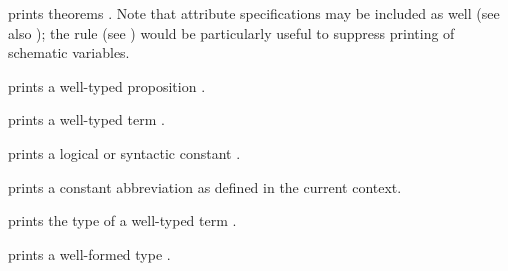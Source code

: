 \begin{isabellebody}
\begin{isamarkuptext}
\begin{descr}
  \item [\isa{{\isachardoublequote}{\isacharat}{\isacharbraceleft}thm\ a\isactrlsub {\isadigit{1}}\ {\isasymdots}\ a\isactrlsub n{\isacharbraceright}{\isachardoublequote}}] prints theorems
  .  Note that attribute specifications
  may be included as well (see also ); the
  \hyperlink{attribute.no-vars}{\mbox{}} rule (see ) would
  be particularly useful to suppress printing of schematic variables.

  \item [\isa{{\isachardoublequote}{\isacharat}{\isacharbraceleft}prop\ {\isasymphi}{\isacharbraceright}{\isachardoublequote}}] prints a well-typed proposition \isa{{\isachardoublequote}{\isasymphi}{\isachardoublequote}}.

  \item [\isa{{\isachardoublequote}{\isacharat}{\isacharbraceleft}term\ t{\isacharbraceright}{\isachardoublequote}}] prints a well-typed term .

  \item [\isa{{\isachardoublequote}{\isacharat}{\isacharbraceleft}const\ c{\isacharbraceright}{\isachardoublequote}}] prints a logical or syntactic constant
  .
  
  \item [\isa{{\isachardoublequote}{\isacharat}{\isacharbraceleft}abbrev\ c\ x\isactrlsub {\isadigit{1}}\ {\isasymdots}\ x\isactrlsub n{\isacharbraceright}{\isachardoublequote}}] prints a constant
  abbreviation  as defined in
  the current context.

  \item [\isa{{\isachardoublequote}{\isacharat}{\isacharbraceleft}typeof\ t{\isacharbraceright}{\isachardoublequote}}] prints the type of a well-typed term
  .

  \item [\isa{{\isachardoublequote}{\isacharat}{\isacharbraceleft}typ\ {\isasymtau}{\isacharbraceright}{\isachardoublequote}}] prints a well-formed type \isa{{\isachardoublequote}{\isasymtau}{\isachardoublequote}}.
  

\end{descr}
\end{isamarkuptext}
\end{isabellebody}
